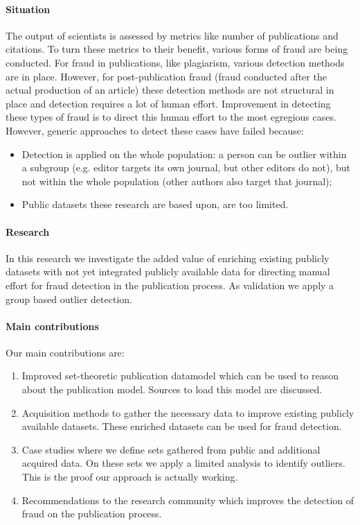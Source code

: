 \documentclass{ou-report}
\begin{document}
\paragraph{Situation}
The output of scientists is assessed by metrics like number of publications 
and citations. To turn these metrics to their benefit, various forms of fraud
are being conducted.
For fraud in publications, like plagiarism, various detection methods are in
place. However, for post-publication fraud (fraud conducted after the actual
production of an article) these detection methods are not structural in place
and detection requires a lot of human effort.
Improvement in detecting these types of fraud is to direct this human effort to
the most egregious cases. However, generic approaches to detect these cases 
have failed because:
\begin{itemize}
    \item Detection is applied on the whole population: a person can be outlier
        within a subgroup (e.g. editor targets its own journal, but other editors do not), 
        but not within the whole population (other authors also target that journal);
    \item Public datasets these research are based upon, are too limited.
\end{itemize}

\paragraph{Research}
In this research we investigate the added value of enriching existing publicly
datasets with not yet integrated publicly available data for directing manual
effort for fraud detection in the publication process. As validation we apply 
a group based outlier detection.

\paragraph{Main contributions}
Our main contributions are:
\begin{enumerate}
    \item Improved set-theoretic publication datamodel which can be used to 
        reason about the publication model. Sources to load this model are 
        discussed.
    \item Acquisition methods to gather the necessary data to improve existing 
        publicly available datasets. These enriched datasets can be used for
        fraud detection.
    \item Case studies where we define sets gathered from public and additional
        acquired data. On these sets we apply a limited analysis to identify 
        outliers. This is the proof our approach is actually working.
    \item Recommendations to the research community which improves the detection of 
        fraud on the publication process. 
\end{enumerate}
\end{document}
